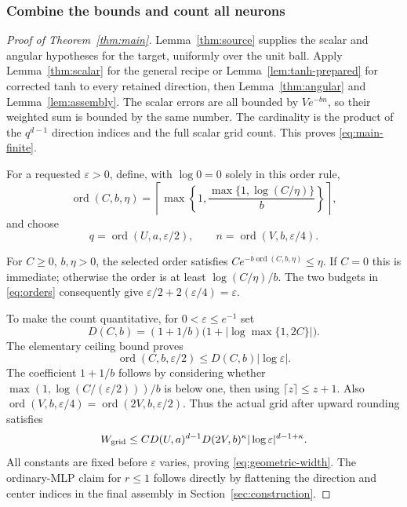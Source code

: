 \documentclass[11pt,letterpaper]{article}
\newcommand{\eps}{\varepsilon}
\newcommand{\ord}{\operatorname{ord}}
\theoremstyle{definition}
\theoremstyle{remark}
\begin{document}
\subsubsection{Combine the bounds and count all neurons}
\begin{proof}[Proof of Theorem~\ref{thm:main}]
Lemma~\ref{thm:source} supplies the scalar and angular hypotheses for the
target, uniformly over the unit ball.
Apply Lemma~\ref{thm:scalar} for the general recipe or
Lemma~\ref{lem:tanh-prepared} for corrected tanh to every retained direction, then
Lemma~\ref{thm:angular} and Lemma~\ref{lem:assembly}.
The scalar errors are all bounded by \(Ve^{-bn}\), so their weighted sum
is bounded by the same number. The cardinality is the product of the
\(q^{d-1}\) direction indices and the full scalar grid count.
This proves \eqref{eq:main-finite}.

For a requested \(\eps>0\), define, with \(\log0=0\) solely in this order rule,
\[
 \ord(C,b,\eta)
   =\left\lceil\max\left\{1,\frac{\max\{1,\log(C/\eta)\}}{b}\right\}\right\rceil,
\]
and choose
\begin{equation}\label{eq:orders}
 q=\ord(U,a,\eps/2),\qquad n=\ord(V,b,\eps/4).
\end{equation}

For \(C\ge0\), \(b,\eta>0\), the selected order satisfies
\(Ce^{-b\ord(C,b,\eta)}\le\eta\). If \(C=0\) this is immediate; otherwise
the order is at least \(\log(C/\eta)/b\).
The two budgets in \eqref{eq:orders} consequently give
\(\eps/2+2(\eps/4)=\eps\).

To make the count quantitative, for \(0<\eps\le e^{-1}\) set
\[
 D(C,b)=(1+1/b)\bigl(1+|\log\max\{1,2C\}|\bigr).
\]
The elementary ceiling bound proves
\[
 \ord(C,b,\eps/2)\le D(C,b)|\log\eps|.
\]
The coefficient \(1+1/b\) follows by considering whether
\(\max(1,\log(C/(\eps/2)))/b\) is below one, then using
\(\lceil z\rceil\le z+1\).
Also \(\ord(V,b,\eps/4)=\ord(2V,b,\eps/2)\).
Thus the actual grid after upward rounding satisfies
\begin{equation}\label{eq:explicit-width}
 W_{\rm grid}\le CD(U,a)^{d-1}D(2V,b)^\kappa
                       |\log\eps|^{d-1+\kappa}.
\end{equation}
All constants are fixed before \(\eps\) varies, proving \eqref{eq:geometric-width}.
The ordinary-MLP claim for \(r\le1\) follows directly by flattening the
direction and center indices in the final assembly in Section~\ref{sec:construction}.
\end{proof}
\end{document}
